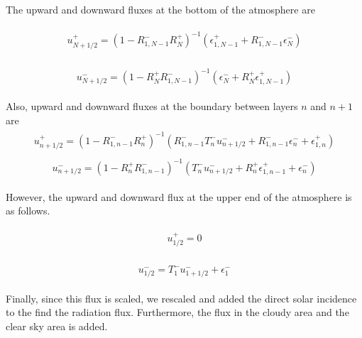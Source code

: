 The upward and downward fluxes at the bottom of the atmosphere are

\begin{eqnarray}
\begin{array}{l}
u_{N+1 / 2}^{+}=\left(1-R_{1, N-1}^{-} R_{N}^{+}\right)^{-1}\left(\epsilon_{1, N-1}^{+}+R_{1, N-1}^{-} \epsilon_{N}^{-}\right)
\end{array}
\end{eqnarray}

\begin{eqnarray}
\begin{array}{l}
u_{N+1 / 2}^{-}=\left(1-R_{N}^{+} R_{1, N-1}^{-}\right)^{-1}\left(\epsilon_{N}^{-}+R_{N}^{+} \epsilon_{1, N-1}^{+}\right)
\end{array}
\end{eqnarray}

Also, upward and downward fluxes at the boundary between layers \(n\)
and \(n+1\) are \begin{eqnarray}
\begin{array}{l}
u_{n+1 / 2}^{+}=\left(1-R_{1, n-1}^{-} R_{n}^{+}\right)^{-1}\left(R_{1, n-1}^{-} T_{n}^{-} u_{n+1 / 2}^{-}+R_{1, n-1}^{-} \epsilon_{n}^{-}+\epsilon_{1, n}^{+}\right)
\end{array}
\end{eqnarray} \begin{eqnarray}
\begin{array}{l}
u_{n+1 / 2}^{-}=\left(1-R_{n}^{+} R_{1, n-1}^{-}\right)^{-1}\left(T_{n}^{-} u_{n+1 / 2}^{-}+R_{n}^{+} \epsilon_{1, n-1}^{+}+\epsilon_{n}^{-}\right)
\end{array}
\end{eqnarray}

However, the upward and downward flux at the upper end of the atmosphere
is as follows.

\begin{eqnarray}
\begin{array}{l}
u_{1 / 2}^{+}=0
\end{array}
\end{eqnarray}

\begin{eqnarray}
\begin{array}{l}
u_{1 / 2}^{-}=T_{1}^{-} u_{1+1 / 2}^{-}+\epsilon_{1}^{-}
\end{array}
\end{eqnarray}

Finally, since this flux is scaled, we rescaled and added the direct
solar incidence to the find the radiation flux. Furthermore, the flux in
the cloudy area and the clear sky area is added.

